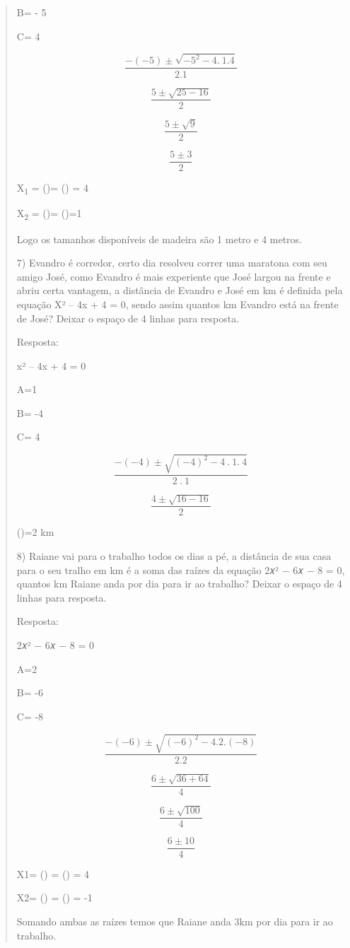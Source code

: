 \begin{quote}
\begin{escolha}
B= - 5

C= 4

\[\frac{- ( - 5) \pm \sqrt{{- 5}^{2} - 4.\ 1.4}}{2.1}\]

\[\frac{5 \pm \sqrt{25 - 16}}{2}\]

\[\frac{5 \pm \sqrt{9}}{2}\]

\[\frac{5 \pm 3}{2}\]

X\textsubscript{1} = ()= () = 4

X\textsubscript{2} = ()= ()=1

Logo os tamanhos disponíveis de madeira são 1 metro e 4 metros.

7) Evandro é corredor, certo dia resolveu correr uma maratona com seu
amigo José, como Evandro é mais experiente que José largou na frente e
abriu certa vantagem, a distância de Evandro e José em km é definida
pela equação X² -- 4x + 4 = 0, sendo assim quantos km Evandro está na
frente de José? Deixar o espaço de 4 linhas para resposta.

Resposta:

x² -- 4x + 4 = 0

A=1

B= -4

C= 4

\[\frac{- ( - 4) \pm \sqrt{{( - 4)}^{2} - 4\ .\ 1.\ 4}}{2\ .\ 1}\]

\[\frac{4 \pm \sqrt{16 - 16}}{2}\]

()=2 km

8) Raiane vai para o trabalho todos os dias a pé, a distância de sua
casa para o seu tralho em km é a soma das raízes da equação 2𝑥² − 6𝑥 − 8
= 0, quantos km Raiane anda por dia para ir ao trabalho? Deixar o espaço
de 4 linhas para resposta.

Resposta:

2𝑥² − 6𝑥 − 8 = 0

A=2

B= -6

C= -8

\[\frac{- ( - 6) \pm \sqrt{{( - 6)}^{2} - 4.2.( - 8)}}{2.2}\]

\[\frac{6 \pm \sqrt{36 + 64}}{4}\]

\[\frac{6 \pm \sqrt{100}}{4}\]

\[\frac{6 \pm 10}{4}\]

X1= () = () = 4

X2= () = () = -1

Somando ambas as raízes temos que Raiane anda 3km por dia para ir ao
trabalho.


\end{escolha}
\end{quote}
